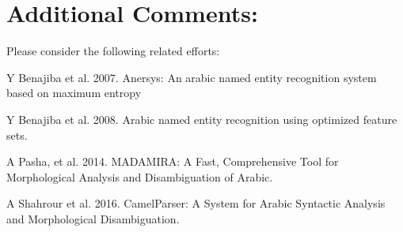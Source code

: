 \section*{Additional Comments:} 
Please consider the following related efforts:

Y Benajiba et al. 2007. Anersys: An arabic named entity recognition system based on maximum entropy

Y Benajiba et al. 2008. Arabic named entity recognition using optimized feature sets.

A Pasha, et al. 2014. MADAMIRA: A Fast, Comprehensive Tool for Morphological Analysis and Disambiguation of Arabic.

A Shahrour et al. 2016. CamelParser: A System for Arabic Syntactic Analysis and Morphological Disambiguation.


